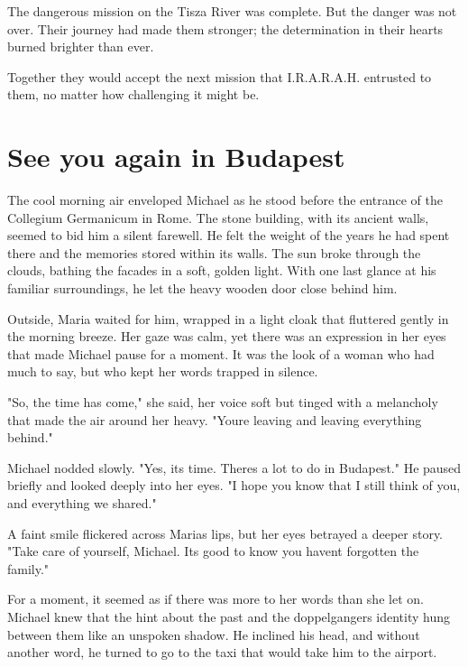 \documentclass[
]{article}
\begin{document}
The dangerous mission on the Tisza River was complete. But the danger was not over. Their journey had made them stronger; the determination in their hearts burned brighter than ever.

Together they would accept the next mission that I.R.A.R.A.H. entrusted to them, no matter how challenging it might be.

\section{See you again in Budapest}\label{see-you-again-in-budapest}

The cool morning air enveloped Michael as he stood before the entrance of the Collegium Germanicum in Rome. The stone building, with its ancient walls, seemed to bid him a silent farewell. He felt the weight of the years he had spent there and the memories stored within its walls. The sun broke through the clouds, bathing the facades in a soft, golden light. With one last glance at his familiar surroundings, he let the heavy wooden door close behind him.

Outside, Maria waited for him, wrapped in a light cloak that fluttered gently in the morning breeze. Her gaze was calm, yet there was an expression in her eyes that made Michael pause for a moment. It was the look of a woman who had much to say, but who kept her words trapped in silence.

"So, the time has come," she said, her voice soft but tinged with a melancholy that made the air around her heavy. "You\textquotesingle re leaving and leaving everything behind."

Michael nodded slowly. "Yes, it\textquotesingle s time. There\textquotesingle s a lot to do in Budapest." He paused briefly and looked deeply into her eyes. "I hope you know that I still think of you, and everything we shared."

A faint smile flickered across Maria\textquotesingle s lips, but her eyes betrayed a deeper story. "Take care of yourself, Michael. It\textquotesingle s good to know you haven\textquotesingle t forgotten the family."

For a moment, it seemed as if there was more to her words than she let on. Michael knew that the hint about the past and the doppelganger\textquotesingle s identity hung between them like an unspoken shadow. He inclined his head, and without another word, he turned to go to the taxi that would take him to the airport.
\end{document}
